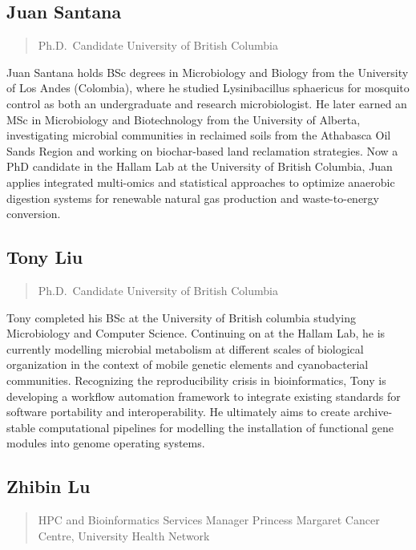 \documentclass[
]{book}
\begin{document}
\subsection{Juan Santana}\label{juan-santana}

\begin{quote}
Ph.D.~Candidate
University of British Columbia
\end{quote}

Juan Santana holds BSc degrees in Microbiology and Biology from the University of Los Andes (Colombia), where he studied Lysinibacillus sphaericus for mosquito control as both an undergraduate and research microbiologist. He later earned an MSc in Microbiology and Biotechnology from the University of Alberta, investigating microbial communities in reclaimed soils from the Athabasca Oil Sands Region and working on biochar-based land reclamation strategies. Now a PhD candidate in the Hallam Lab at the University of British Columbia, Juan applies integrated multi-omics and statistical approaches to optimize anaerobic digestion systems for renewable natural gas production and waste-to-energy conversion.

\subsection{Tony Liu}\label{tony-liu}

\begin{quote}
Ph.D.~Candidate
University of British Columbia
\end{quote}

Tony completed his BSc at the University of British columbia studying Microbiology and Computer Science. Continuing on at the Hallam Lab, he is currently modelling microbial metabolism at different scales of biological organization in the context of mobile genetic elements and cyanobacterial communities. Recognizing the reproducibility crisis in bioinformatics, Tony is developing a workflow automation framework to integrate existing standards for software portability and interoperability. He ultimately aims to create archive-stable computational pipelines for modelling the installation of functional gene modules into genome operating systems.

\subsection{Zhibin Lu}\label{zhibin-lu}

\begin{quote}
HPC and Bioinformatics Services Manager
Princess Margaret Cancer Centre, University Health Network
\end{quote}
\end{document}
